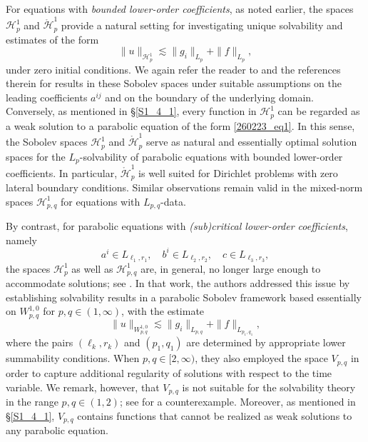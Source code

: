 \documentclass[reqno]{amsart}
\numberwithin{equation}{section}
\theoremstyle{plain}
\theoremstyle{definition}
\def\cH{\mathcal{H}}
\begin{document}
For equations with {\em bounded lower-order coefficients}, as noted earlier, the spaces $\cH^1_p$ and $\mathring{\cH}^1_p$ provide a natural setting for investigating unique solvability and estimates of the form
$$
\|u\|_{\cH^1_p}\lesssim \|g_i\|_{L_p}+\|f\|_{L_p},
$$
under zero initial conditions.
We again refer the reader to \cite{MR2187159, MR2329320, MR2832162, MR2835999, MR2304157} and the references therein for results in these Sobolev spaces under suitable assumptions on the leading coefficients $a^{ij}$ and on the boundary of the underlying domain.
Conversely, as mentioned in \S \ref{S1_4_1}, every function in $\cH^1_p$  can be regarded as  a weak solution to a parabolic equation of the form \eqref{260223_eq1}.
In this sense,  the Sobolev spaces $\cH^1_p$ and $\mathring{\cH}^1_p$ serve as natural and essentially optimal solution spaces for the $L_p$-solvability of parabolic equations with bounded lower-order coefficients.
In particular, $\mathring{\cH}^1_p$ is well suited for Dirichlet problems with zero lateral boundary conditions.
Similar observations remain valid in the mixed-norm spaces $\cH^1_{p,q}$ for equations with $L_{p,q}$-data.

By contrast, for parabolic equations with {\em (sub)critical lower-order coefficients}, namely
\begin{equation}		\label{260429_eq1}
a^i\in L_{\ell_1, r_1}, \quad  b^i\in L_{\ell_2, r_2}, \quad   c\in L_{\ell_3, r_3},
\end{equation}
the spaces $\cH^1_p$ as well as $\cH^1_{p,q}$ are, in general, no longer large enough to accommodate solutions; see \cite{MR4387945}.
In that work, the authors addressed this issue by establishing solvability results in a parabolic Sobolev framework based essentially on $W^{1,0}_{p,q}$ for $p,q\in (1, \infty)$, with the estimate
$$
\|u\|_{W^{1,0}_{p,q}}\lesssim \|g_i\|_{L_{p,q}}+\|f\|_{L_{p_1,q_1}},
$$
where the pairs $(\ell_k, r_k)$ and $(p_1, q_1)$ are determined by appropriate lower summability conditions.
When $p,q\in [2, \infty)$, they also employed the space $V_{p,q}$ in order to capture additional regularity of solutions with respect to the time variable.
We remark, however, that $V_{p,q}$ is not suitable for the solvability theory in the range $p,q\in (1,2)$; see \cite{MR2433518} for a counterexample.
Moreover, as mentioned in \S \ref{S1_4_1}, $V_{p,q}$ contains functions that cannot be realized as weak solutions to any parabolic equation.
\end{document}
